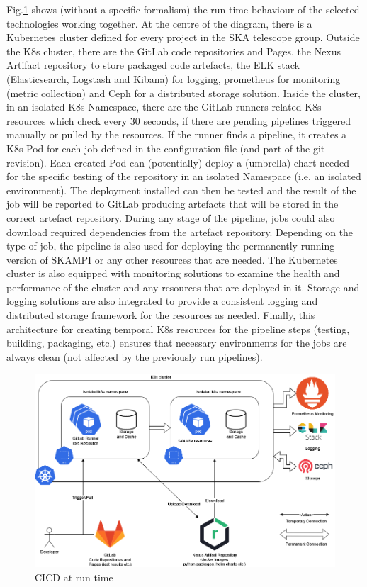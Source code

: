 \documentclass[a4paper,
               keeplastbox,   %
               ]{jacow}
\begin{document}
Fig.\ref{fig:cicdruntime} shows (without a specific formalism) the run-time behaviour of the selected technologies working together. At the centre of the diagram, there is a Kubernetes cluster defined for every project in the SKA telescope group. Outside the K8s cluster, there are the GitLab code repositories and Pages, the Nexus Artifact repository\cite{nexus} to store packaged code artefacts, the ELK stack (Elasticsearch, Logstash and Kibana)\cite{elastcsearch} for logging, prometheus\cite{prometheus} for monitoring (metric collection) and Ceph\cite{ceph} for a distributed storage solution.
Inside the cluster, in an isolated K8s Namespace, there are the GitLab runners related K8s resources which check every 30 seconds, if there are pending pipelines triggered manually or pulled by the resources. If the runner finds a pipeline, it creates a K8s Pod for each job defined in the configuration file (and part of the git revision). Each created Pod can (potentially) deploy a (umbrella) chart needed for the specific testing of the repository in an isolated Namespace (i.e. an isolated environment). The deployment installed can then be tested and the result of the job will be reported to GitLab producing artefacts that will be stored in the correct artefact repository. During any stage of the pipeline, jobs could also download required dependencies from the artefact repository. Depending on the type of job, the pipeline is also used for deploying the permanently running version of SKAMPI or any other resources that are needed. The Kubernetes cluster is also equipped with monitoring solutions to examine the health and performance of the cluster and any resources that are deployed in it. Storage and logging solutions are also integrated to provide a consistent logging and distributed storage framework for the resources as needed. Finally, this architecture for creating temporal K8s resources for the pipeline steps (testing, building, packaging, etc.) ensures that necessary environments for the jobs are always clean (not affected by the previously run pipelines).

\begin{figure}[!htb]
   \centering
   \includegraphics*[width=0.8\columnwidth]{cicdruntime-v2}
   \caption{CICD at run time}
   \label{fig:cicdruntime}
\end{figure}
\end{document}
